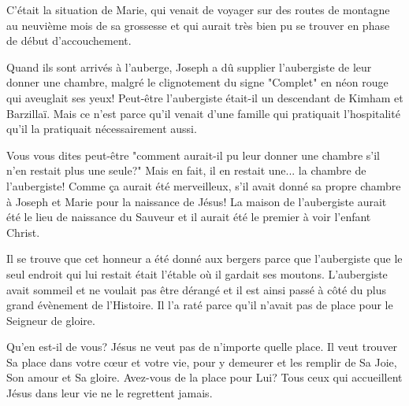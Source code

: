 C'était la situation de Marie, qui venait de voyager sur des routes de montagne au neuvième mois de sa grossesse et qui aurait très bien pu se trouver en phase de début d'accouchement.

Quand ils sont arrivés à l'auberge, Joseph a dû supplier l'aubergiste de leur donner une chambre, malgré le clignotement du signe "Complet" en néon rouge qui aveuglait ses yeux! Peut-être l'aubergiste était-il un descendant de Kimham et Barzillaï. Mais ce n'est parce qu'il venait d'une famille qui pratiquait l'hospitalité qu'il la pratiquait nécessairement aussi.

Vous vous dites peut-être "comment aurait-il pu leur donner une chambre s'il n'en restait plus une seule?" Mais en fait, il en restait une... la chambre de l'aubergiste! Comme ça aurait été merveilleux, s'il avait donné sa propre chambre à Joseph et Marie pour la naissance de Jésus! La maison de l'aubergiste aurait été le lieu de naissance du Sauveur et il aurait été le premier à voir l'enfant Christ.

Il se trouve que cet honneur a été donné aux bergers parce que l'aubergiste que le seul endroit qui lui restait était l'étable où il gardait ses moutons. L'aubergiste avait sommeil et ne voulait pas être dérangé et il est ainsi passé à côté du plus grand évènement de l'Histoire. Il l'a raté parce qu'il n'avait pas de place pour le Seigneur de gloire.

Qu'en est-il de vous? Jésus ne veut pas de n'importe quelle place. Il veut trouver Sa place dans votre cœur et votre vie, pour y demeurer et les remplir de Sa Joie, Son amour et Sa gloire. Avez-vous de la place pour Lui? Tous ceux qui accueillent Jésus dans leur vie ne le regrettent jamais.




